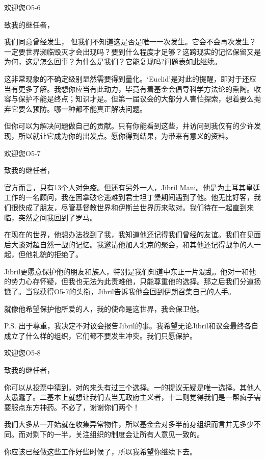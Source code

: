 \begin{scpbox}

欢迎您O5-6

致我的继任者，

我们同意曾经发生， 但我们不知道这是否是唯一一次发生。它会不会再次发生？一定要世界濒临毁灭才会出现吗？要到什么程度才足够？这跨现实的记忆保留又是为何，这是怎么回事？为什么是我们？它能复现吗?问题表如此继续。

这非常现象的不确定级别显然需要得到量化。‘Euclid’是对此的提醒，即对于还应当有更多了解。我想你应当有此动力，毕竟有着基金会倡导科学方法论的熏陶。收容与保护不能是终点；知识才是。但第一届议会的大部分人害怕探索，想着要么抛弃它要么预防。哪一种都不能真正解决问题。

但你可以为解决问题做自己的贡献。只有你能看到这些，并访问到我仅有的少许发现，所以就让它成为你的出发点。愿你得到结果，为带来有意义的资料。

\end{scpbox}

\begin{scpbox}

欢迎您O5-7

致我的继任者，

官方而言，只有13个人对免疫。但还有另外一人，Jibril Mani。他是为土耳其皇廷工作的一名顾问，我在因拿破仑逃难到君士坦丁堡期间遇到了他。他无比好客，我们很快成了朋友，尽管基督教世界和伊斯兰世界历来敌对。我们待在一起直到来临，突然之间我回到了罗马。

在现在的世界，他想办法找到了我，我知道他还记得我们曾经的友谊。我们在见面后大谈对超自然一战的记忆。我邀请他加入北京的聚会，和其他还记得战争的人一起，但他礼貌的拒绝了。

Jibril更愿意保护他的朋友和族人，特别是我们知道中东正一片混乱。他对一和他的势力心存怀疑，但我也无法为此责难他，只能尊重他的选择。那之后我们分道扬镳了。当我获得O5-7的头衔，Jibril告诉我他\hyperref[chap:ORI-oria.hub]{会回到伊朗召集自己的人手}。

就像他希望保护他所爱的人，我的使命是这世界，我会保卫他。

P.S. 出于尊重，我决定不对议会报告Jibril的事。我希望无论Jibril和议会最终各自成立了什么样的组织，它们都不要发生冲突。我们只愿保护。

\end{scpbox}

\begin{scpbox}

欢迎您O5-8

致我的继任者，

你可以从投票中猜到，对的来头有过三个选择。一的提议无疑是唯一选择。其他人太愚蠢了。二基本上就想让我们去当无政府主义者，十二则觉得我们是一帮疯子需要服点东方神药。不必了，谢谢你们两个！

我们大多从一开始就在收集异常物件，所以基金会对多半前身组织而言并无多少不同。而对剩下的一半，关注组织的制度会让所有人意见一致的。

你应该已经做这些工作好些时候了，所以我希望你继续下去。

\end{scpbox}

